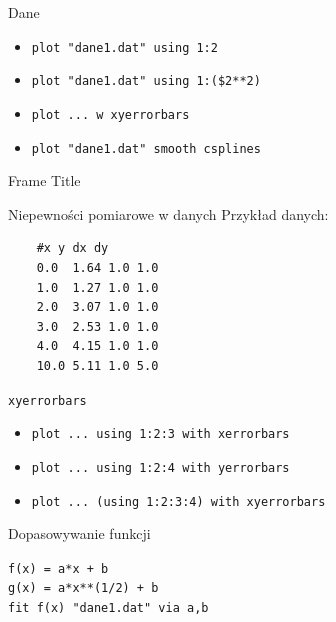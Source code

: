 \documentclass{beamer}
\begin{document}
\begin{frame}[containsverbatim]{Dane}

\begin{itemize}
    \item \verb|plot "dane1.dat" using 1:2|
    \item \verb|plot "dane1.dat" using 1:($2**2)|
    \item \verb|plot ... w xyerrorbars|
    \item  \verb|plot "dane1.dat" smooth csplines|
\end{itemize}
    
\end{frame}
\begin{frame}{Frame Title}
    
\end{frame}

\begin{frame}[containsverbatim]{Niepewności pomiarowe w danych}
Przykład danych:

\begin{verbatim}
    #x y dx dy
    0.0  1.64 1.0 1.0
    1.0  1.27 1.0 1.0
    2.0  3.07 1.0 1.0
    3.0  2.53 1.0 1.0
    4.0  4.15 1.0 1.0
    10.0 5.11 1.0 5.0
\end{verbatim}
\end{frame}
\begin{frame}[containsverbatim]{\texttt{xyerrorbars}}
    \begin{itemize}
        \item \verb|plot ... using 1:2:3 with xerrorbars|
        \item \verb|plot ... using 1:2:4 with yerrorbars|
        \item \verb|plot ... (using 1:2:3:4) with xyerrorbars|
    \end{itemize}
\end{frame}

    
\begin{frame}[containsverbatim]{Dopasowywanie funkcji}

\verb|f(x) = a*x + b|\\
\verb|g(x) = a*x**(1/2) + b|\\[2mm]
\verb|fit f(x) "dane1.dat" via a,b|

\end{frame}


\end{document}

